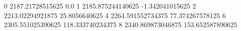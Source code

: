 0 2187.21728515625 0.0
1 2185.875244140625 -1.342041015625
2 2213.02294921875 25.8056640625
4 2264.591552734375 77.374267578125
6 2305.551025390625 118.333740234375
8 2340.869873046875 153.652587890625
